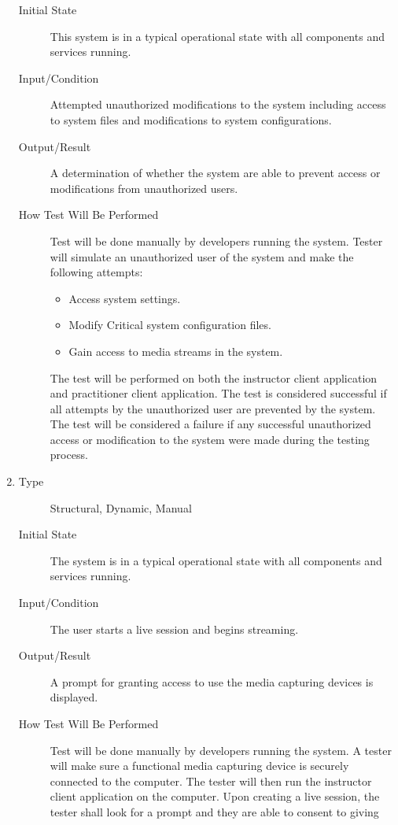 \documentclass[12pt, titlepage]{article}
\begin{document}
\begin{enumerate}[NFR-T1]
\begin{description}
  \item[Initial State] This system is in a typical operational state with all
    components and services running.
  \item[Input/Condition] Attempted unauthorized modifications to the system
    including access to system files and modifications to system configurations.
  \item[Output/Result] A determination of whether the system are able to prevent
    access or modifications from unauthorized users.
  \item[How Test Will Be Performed] Test will be done manually by developers
    running the system. Tester will simulate an unauthorized user of the system
    and make the following attempts:
    \begin{itemize}
    \item Access system settings.
    \item Modify Critical system configuration files.
    \item Gain access to media streams in the system.
    \end{itemize}
    The test will be performed on both the instructor client application and
    practitioner client application. The test is considered successful if all
    attempts by the unauthorized user are prevented by the system. The test will
    be considered a failure if any successful unauthorized access or
    modification to the system were made during the testing process.
  \end{description}
\item \label{NFRT24}
  \begin{description}
  \item[Type] Structural, Dynamic, Manual
  \item[Initial State] The system is in a typical operational state with all
    components and services running.
  \item[Input/Condition] The user starts a live session and begins streaming.
  \item[Output/Result] A prompt for granting access to use the media capturing
    devices is displayed.
  \item[How Test Will Be Performed] Test will be done manually by developers
    running the system. A tester will make sure a functional media capturing
    device is securely connected to the computer. The tester will then run the
    instructor client application on the computer. Upon creating a live session,
    the tester shall look for a prompt and they are able to consent to giving

\end{description}
\end{enumerate}
\end{document}
